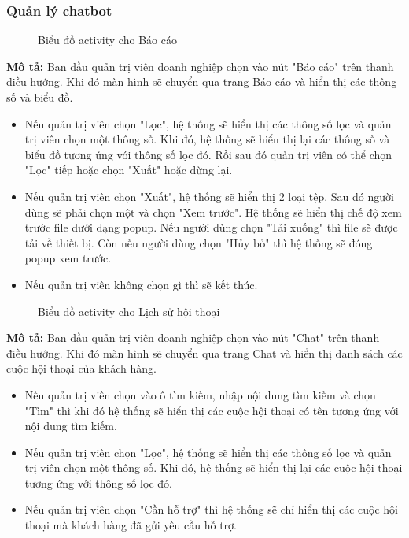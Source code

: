 \subsubsection{Quản lý chatbot}
\begin{figure}[H]
    \centering
     
    \vspace{0.5cm}
    \caption{Biểu đồ activity cho Báo cáo}
    \label{fig:enter-label}
\end{figure}
\textbf{Mô tả:}
Ban đầu quản trị viên doanh nghiệp chọn vào nút "Báo cáo" trên thanh điều hướng. Khi đó màn hình sẽ chuyển qua trang Báo cáo và hiển thị các thông số và biểu đồ.
\begin{itemize}
    \item Nếu quản trị viên chọn "Lọc", hệ thống sẽ hiển thị các thông số lọc và quản trị viên chọn một thông số. Khi đó, hệ thống sẽ hiển thị lại các thông số và biểu đồ tương ứng với thông số lọc đó. Rồi sau đó quản trị viên có thể chọn "Lọc" tiếp hoặc chọn "Xuất" hoặc dừng lại.
    \item Nếu quản trị viên chọn "Xuất", hệ thống sẽ hiển thị 2 loại tệp. Sau đó người dùng sẽ phải chọn một và chọn "Xem trước". Hệ thống sẽ hiển thị chế độ xem trước file dưới dạng popup. Nếu người dùng chọn "Tải xuống" thì file sẽ được tải về thiết bị. Còn nếu người dùng chọn "Hủy bỏ" thì hệ thống sẽ đóng popup xem trước.
    \item Nếu quản trị viên không chọn gì thì sẽ kết thúc.
\end{itemize}
\begin{figure}[H]
    \centering
     
    \vspace{0.5cm}
    \caption{Biểu đồ activity cho Lịch sử hội thoại}
    \label{fig:enter-label}
\end{figure}
\textbf{Mô tả:}
Ban đầu quản trị viên doanh nghiệp chọn vào nút "Chat" trên thanh điều hướng. Khi đó màn hình sẽ chuyển qua trang Chat và hiển thị danh sách các cuộc hội thoại của khách hàng.
\begin{itemize}
    \item Nếu quản trị viên chọn vào ô tìm kiếm, nhập nội dung tìm kiếm và chọn "Tìm" thì khi đó hệ thống sẽ hiển thị các cuộc hội thoại có tên tương ứng với nội dung tìm kiếm.
    \item Nếu quản trị viên chọn "Lọc", hệ thống sẽ hiển thị các thông số lọc và quản trị viên chọn một thông số. Khi đó, hệ thống sẽ hiển thị lại các cuộc hội thoại tương ứng với thông số lọc đó. 
    \item Nếu quản trị viên chọn "Cần hỗ trợ" thì hệ thống sẽ chỉ hiển thị các cuộc hội thoại mà khách hàng đã gửi yêu cầu hỗ trợ.
\end{itemize}

